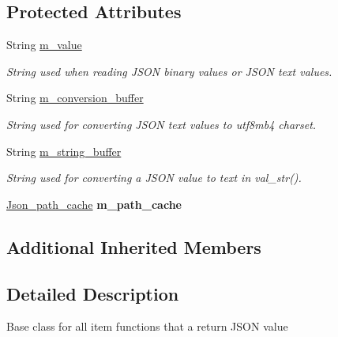 \subsection*{Protected Attributes}
\begin{DoxyCompactItemize}
\item 
\mbox{\label{classItem__json__func_aa3dda9d17b38b63787a654d8db447107}} 
String \mbox{\hyperlink{classItem__json__func_aa3dda9d17b38b63787a654d8db447107}{m\+\_\+value}}
\begin{DoxyCompactList}\small\item\em String used when reading J\+S\+ON binary values or J\+S\+ON text values. \end{DoxyCompactList}\item 
\mbox{\label{classItem__json__func_a7632304ab342a2f93753ec2070c23b1a}} 
String \mbox{\hyperlink{classItem__json__func_a7632304ab342a2f93753ec2070c23b1a}{m\+\_\+conversion\+\_\+buffer}}
\begin{DoxyCompactList}\small\item\em String used for converting J\+S\+ON text values to utf8mb4 charset. \end{DoxyCompactList}\item 
\mbox{\label{classItem__json__func_ad3424040d3eff3fea02fe6f54849dbfe}} 
String \mbox{\hyperlink{classItem__json__func_ad3424040d3eff3fea02fe6f54849dbfe}{m\+\_\+string\+\_\+buffer}}
\begin{DoxyCompactList}\small\item\em String used for converting a J\+S\+ON value to text in val\+\_\+str(). \end{DoxyCompactList}\item 
\mbox{\label{classItem__json__func_ade1bb2f7f7aa062625a334d6ec5b23ac}} 
\mbox{\hyperlink{classJson__path__cache}{Json\+\_\+path\+\_\+cache}} {\bfseries m\+\_\+path\+\_\+cache}
\end{DoxyCompactItemize}
\subsection*{Additional Inherited Members}


\subsection{Detailed Description}
Base class for all item functions that a return J\+S\+ON value 

